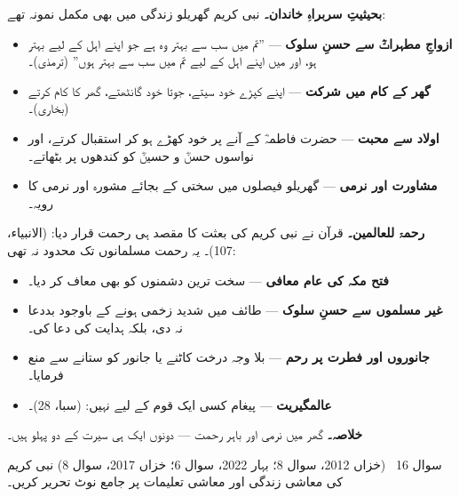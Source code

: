 \begin{hal}
\textbf{بحیثیتِ سربراہِ خاندان۔} نبی کریم \saw گھریلو زندگی میں بھی مکمل
نمونہ تھے:
\begin{itemize}\setlength{\itemsep}{1pt}
  \item \textbf{ازواجِ مطہراتؓ سے حسنِ سلوک} --- ''تم میں سب سے بہتر وہ
        ہے جو اپنے اہل کے لیے بہتر ہو، اور میں اپنے اہل کے لیے تم میں سب
        سے بہتر ہوں'' (ترمذی)۔
  \item \textbf{گھر کے کام میں شرکت} --- اپنے کپڑے خود سیتے، جوتا خود
        گانٹھتے، گھر کا کام کرتے (بخاری)۔
  \item \textbf{اولاد سے محبت} --- حضرت فاطمہؓ کے آنے پر خود کھڑے ہو کر
        استقبال کرتے، اور نواسوں حسنؓ و حسینؓ کو کندھوں پر بٹھاتے۔
  \item \textbf{مشاورت اور نرمی} --- گھریلو فیصلوں میں سختی کے بجائے مشورہ
        اور نرمی کا رویہ۔
\end{itemize}

\medskip
\textbf{رحمۃ للعالمین۔} قرآن نے نبی کریم \saw کی بعثت کا مقصد ہی رحمت
قرار دیا: 
(الانبیاء، \textenglish{107})۔ یہ رحمت مسلمانوں تک محدود نہ تھی:

\begin{itemize}\setlength{\itemsep}{1pt}
  \item \textbf{فتح مکہ کی عام معافی} --- سخت ترین دشمنوں کو بھی معاف کر
        دیا۔
  \item \textbf{غیر مسلموں سے حسنِ سلوک} --- طائف میں شدید زخمی ہونے کے
        باوجود بددعا نہ دی، بلکہ ہدایت کی دعا کی۔
  \item \textbf{جانوروں اور فطرت پر رحم} --- بلا وجہ درخت کاٹنے یا جانور
        کو ستانے سے منع فرمایا۔
  \item \textbf{عالمگیریت} --- پیغام کسی ایک قوم کے لیے نہیں:  (سبا، \textenglish{28})۔
\end{itemize}

\medskip
\textbf{خلاصہ۔} گھر میں نرمی اور باہر رحمت --- دونوں ایک ہی سیرت کے دو
پہلو ہیں۔
\end{hal}

\begin{sawal}{سوال \textenglish{16} \ \textnormal{\small(خزاں \textenglish{2012}، سوال \textenglish{8}؛ بہار \textenglish{2022}، سوال \textenglish{6}؛ خزاں \textenglish{2017}، سوال \textenglish{8})}}
نبی کریم \saw کی معاشی زندگی اور معاشی تعلیمات پر جامع نوٹ تحریر کریں۔
\end{sawal}

